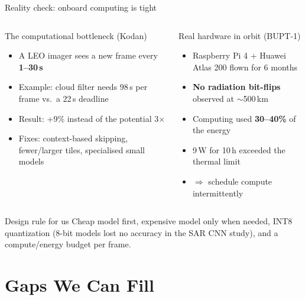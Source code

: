 \documentclass[aspectratio=169,10pt]{beamer}
\begin{document}
\begin{frame}{Reality check: onboard computing is tight}
\begin{columns}[T]
\begin{block}{The computational bottleneck (Kodan)}
\footnotesize
\begin{itemize}
  \item A LEO imager sees a new frame every \textbf{1--30\,s}
  \item Example: cloud filter needs 98\,s per frame vs.\ a 22\,s deadline
  \item Result: +9\% instead of the potential 3$\times$
  \item Fixes: context-based skipping, fewer/larger tiles, specialised small models
\end{itemize}
\end{block}
\begin{block}{Real hardware in orbit (BUPT-1)}
\footnotesize
\begin{itemize}
  \item Raspberry Pi 4 + Huawei Atlas 200 flown for 6 months
  \item \textbf{No radiation bit-flips} observed at $\sim$500\,km
  \item Computing used \textbf{30--40\%} of the energy
  \item 9\,W for 10\,h exceeded the thermal limit
  \item $\Rightarrow$ schedule compute intermittently
\end{itemize}
\end{block}
\end{columns}
\vspace{2mm}
\begin{exampleblock}{Design rule for us}
\footnotesize Cheap model first, expensive model only when needed, INT8 quantization (8-bit models lost no accuracy in the SAR CNN study), and a compute/energy budget per frame.
\end{exampleblock}
\end{frame}

\section{Gaps We Can Fill}
\end{document}
